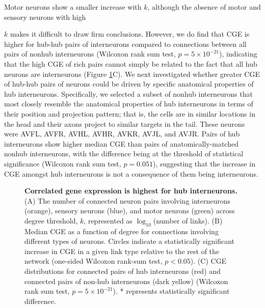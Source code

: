 Motor neurons show a smaller increase with $k$, although the absence of motor and sensory neurons with high {$k$ makes it difficult to draw firm conclusions.
However, we do find that CGE is higher for hub-hub pairs of interneurons compared to connections between all pairs of nonhub interneurons (Wilcoxon rank sum test, $p = 5 \times 10^{-21}$), indicating that the high CGE of rich pairs cannot simply be related to the fact that all hub neurons are interneurons (Figure \ref{fig:Ch2Fig7}C).
We next investigated whether greater CGE of hub-hub pairs of neurons could be driven by specific anatomical properties of hub interneurons.
Specifically, we selected a subset of nonhub interneurons that most closely resemble the anatomical properties of hub interneurons in terms of their position and projection pattern; that is, the cells are in similar locations in the head and their axons project to similar targets in the tail. These neurons were AVFL, AVFR, AVHL, AVHR, AVKR, AVJL, and AVJR.
Pairs of hub interneurons show higher median CGE than pairs of anatomically-matched nonhub interneurons, with the difference being at the threshold of statistical significance (Wilcoxon rank sum test, $p = 0.051$), suggesting that the increase in CGE amongst hub interneurons is not a consequence of them being interneurons.

\begin{figure}[!h]
 \caption{
\textbf{Correlated gene expression is highest for hub interneurons.}
(A) The number of connected neuron pairs involving interneurons (orange), sensory neurons (blue), and motor neurons (green) across degree threshold, $k$, represented as $\log_{10}$(number of links).
(B) Median CGE as a function of degree for connections involving different types of neurons.
Circles indicate a statistically significant increase in CGE in a given link type relative to the rest of the network (one-sided Wilcoxon rank-sum test, $p < 0.05$).
(C) CGE distributions for connected pairs of hub interneurons (red) and connected pairs of non-hub interneurons (dark yellow) (Wilcoxon rank sum test, $p = 5 \times 10^{-21}$). * represents statistically significant difference.
}
 \label{fig:Ch2Fig7}
\end{figure}

}
